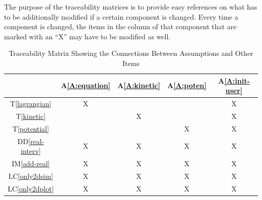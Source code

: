 \documentclass[12pt, titlepage]{article}
\newcommand{\ddref}[1]{DD\ref{#1}}
\newcommand{\tref}[1]{T\ref{#1}}
\newcommand{\aref}[1]{A\ref{#1}}
\newcommand{\iref}[1]{IM\ref{#1}}
\newcommand{\lcref}[1]{LC\ref{#1}}
\begin{document}
The purpose of the traceability matrices is to provide easy references on what
has to be additionally modified if a certain component is changed. Every time a
component is changed, the items in the column of that component that are marked
with an ``X'' may have to be modified as well. 

\begin{table}[!htb]
\centering
\label{Table:A_trace}
\begin{tabular}{|c|c|c|c|c|}
\hline
	& \aref{A:equation} 
	& \aref{A:kinetic}
	& \aref{A:poten}
	& \aref{A:init-user} \\
\hline
\tref{lagrangian} & X &  &  & X \\ \hline
\tref{kinetic} &  & X &  & X \\ \hline
\tref{potential} &  &  & X & X \\ \hline
\ddref{real-interv} & X & X & X & X \\ \hline
\iref{add-real} & X & X & X & X \\ \hline
\lcref{only2dsim} & X & X & X & X \\ \hline
\lcref{only2dplot} & X & X & X & X \\ \hline
\end{tabular}
\caption{Traceability Matrix Showing the Connections Between Assumptions 
and Other Items}
\end{table}
\end{document}
